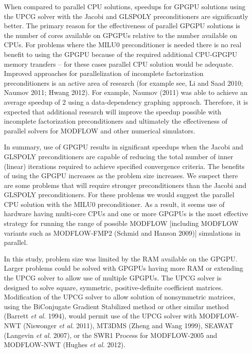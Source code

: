\documentclass[12pt]{article}
\begin{document}
When compared to parallel CPU solutions, speedups for GPGPU solutions using the UPCG solver with the Jacobi and GLSPOLY preconditioners are significantly better. \color{blue}The primary reason for the effectiveness of parallel GPGPU solutions is the number of cores available on GPGPUs relative to the number available on CPUs. \color{black}For problems where the MILU0 preconditioner is needed there is no real benefit to using the GPGPU because of the required additional CPU-GPGPU memory transfers -- for these cases parallel CPU solution would be adequate. \color{blue}Improved approaches for parallelization of incomplete factorization preconditioners is an active area of research (for example see, Li and Saad 2010; Naumov 2011; Hwang 2012). For example, Naumov (2011) was able to achieve an average speedup of 2 using a data-dependency graphing approach. Therefore, it is expected that additional research will improve the speedup possible with incomplete factorization preconditioners and ultimately the effectiveness of parallel solvers for MODFLOW and other numerical simulators.\color{black}

In summary, use of GPGPU results in significant speedups when the Jacobi and GLSPOLY preconditioners are capable of reducing the total number of inner (linear) iterations required to achieve specified convergence criteria. The benefits of using the GPGPU increases as the problem size increases. \color{blue}We suspect there are some problems that will require stronger preconditioners than the Jacobi and GLSPOLY preconditioners. For these problems we would suggest the parallel CPU solution with the MILU0 preconditioner. As a result, it seems use of hardware having multi-core CPUs and one or more GPGPUs is the most effective strategy for running the range of possible MODFLOW \color{cyan}[including MODFLOW variants such as MODFLOW-FMP2 (Schmid and Hanson 2009)] \color{blue} simulations in parallel.\color{black}

In this study, problem size was limited by the RAM available on the GPGPU. Larger problems could be solved with GPGPUs having more RAM or extending the UPCG solver to allow use of multiple GPGPUs. The UPCG solver is designed to solve  square, symmetric, positive-definite coefficient matrices. Modification of the UPCG solver to allow solution of nonsymmetric matrices, using the BiConjugate Gradient Stabilized method or other similar method (Barrett \textit{et al.} 1994), would permit use of the UPCG solver with MODFLOW-NWT (Niswonger \textit{et al.} 2011), MT3DMS (Zheng and Wang 1999), SEAWAT (Langevin \textit{et al.} 2007), \color{cyan} or the SWR1 Process for MODFLOW-2005 and MODFLOW-NWT (Hughes \textit{et al.} 2012)\color{black}.
 
\end{document}
